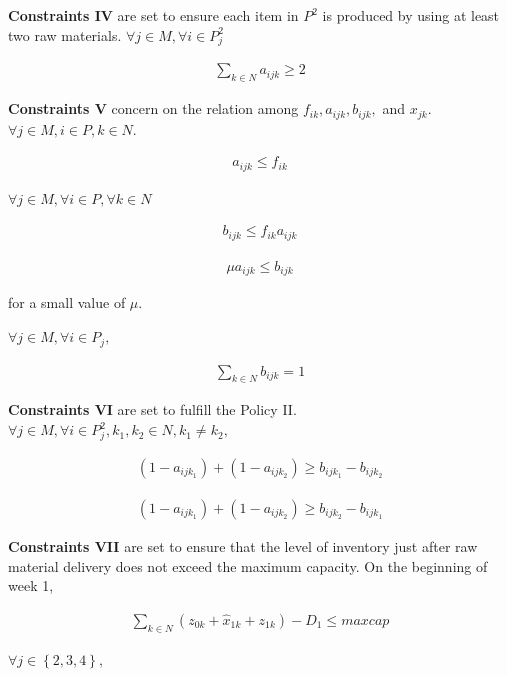 \documentclass[preprint, 3p,
authoryear]{elsarticle} %
\begin{document}
\textbf{Constraints IV} are set to ensure each item in \(P^2\) is
produced by using at least two raw materials.
\(\forall j \in M, \forall i \in P^2_j\)

\begin{align}
  \sum_{k \in N} a_{ijk} \geq 2
\end{align}

\textbf{Constraints V} concern on the relation among
\(f_{ik}, a_{ijk}, b_{ijk},\) and \(x_{jk}\).
\(\forall j \in M, i \in P, k \in N\).

\begin{align}
  a_{ijk} \leq f_{ik}
\end{align}

\(\forall j \in M, \forall i \in P, \forall k \in N\)

\begin{align}
  b_{ijk} \leq f_{ik} a_{ijk}
\end{align}

\begin{align}
  \mu a_{ijk} \leq b_{ijk}
\end{align}

for a small value of \(\mu\).

\(\forall j \in \hat{M}, \forall i \in P_j,\)

\begin{align}
  \sum_{k \in N} b_{ijk} = 1
\end{align}

\textbf{Constraints VI} are set to fulfill the Policy II.
\(\forall j \in \hat{M}, \forall i \in P^2_j, k_1, k_2 \in N, k_1 \neq k_2,\)

\begin{align}
  (1 - a_{ijk_1}) + (1 - a_{ijk_2}) \geq b_{ijk_1} - b_{ijk_2}
\end{align}

\begin{align}
  (1 - a_{ijk_1}) + (1 - a_{ijk_2}) \geq b_{ijk_2} - b_{ijk_1}
\end{align}

\textbf{Constraints VII} are set to ensure that the level of inventory
just after raw material delivery does not exceed the maximum capacity.
On the beginning of week 1,

\begin{align}
  \sum_{k \in N} (z_{0k} + \hat{x}_{1k} + z_{1k}) - D_1 \leq maxcap
\end{align}

\(\forall j \in \left\{ 2,3,4 \right\},\)
\end{document}
